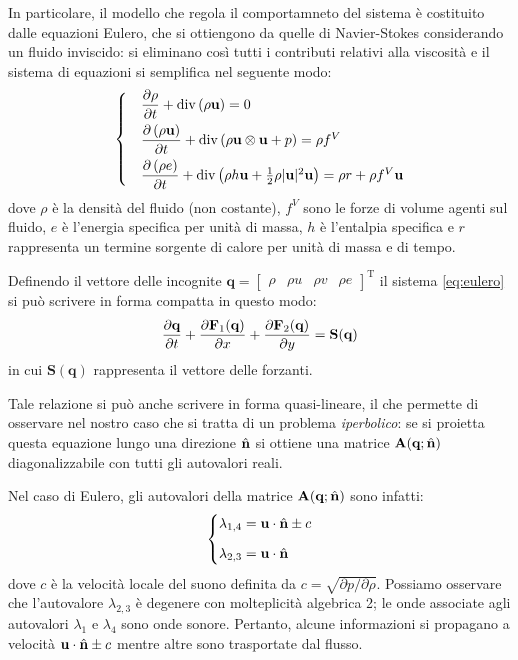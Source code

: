 In particolare, il modello che regola il comportamneto del sistema è costituito dalle equazioni Eulero, che si ottiengono da quelle di Navier-Stokes considerando un fluido inviscido: si eliminano così tutti i contributi relativi alla viscosità e il sistema di equazioni si semplifica nel seguente modo:
\begin{equation} \label{eq:eulero}
\begin{cases}
&\dfrac{\partial \rho}{\partial t} + \operatorname{div} \left(\rho \textbf{u}\right) = 0\\[1.5ex]
&\dfrac{\partial \left(\rho \textbf{u}\right)}{\partial t} + \operatorname{div} \left(\rho \textbf{u} \otimes \textbf{u} + p \right) = \rho f^{V}\\[1.5ex]
&\dfrac{\partial \left(\rho e\right)}{\partial t} + \operatorname{div} \left(\rho h \textbf{u} + \frac{1}{2} \rho |\textbf{u}|^{2} \textbf{u} \right) = \rho r + \rho f^{V} \textbf{u}
\end{cases}
\end{equation}
dove $\rho$ è la densità del fluido (non costante), $f^{V}$ sono le forze di volume agenti sul fluido, $e$ è l'energia specifica per unità di massa, $h$ è l'entalpia specifica e $r$ rappresenta un termine sorgente di calore per unità di massa e di tempo.  

Definendo il vettore delle incognite $\textbf{q} = \left[ \begin{matrix} \rho & \rho u & \rho v & \rho e \end{matrix} \right]^{\text{T}}$ il sistema \eqref{eq:eulero} si può scrivere in forma compatta in questo modo:
\begin{equation*}
\dfrac{\partial \textbf{q}}{\partial t} + \dfrac{\partial \textbf{F}_{1}(\textbf{q})}{\partial x} + \dfrac{\partial \textbf{F}_{2}(\textbf{q})}{\partial y} = \textbf{S}(\textbf{q})
\end{equation*}
in cui $\textbf{S}(\textbf{q})$ rappresenta il vettore delle forzanti.
 
Tale relazione si può anche scrivere in forma quasi-lineare, il che permette di osservare nel nostro caso che si tratta di un problema \emph{iperbolico}: se si proietta questa equazione lungo una direzione $\hat{\mathbf{n}}$ si ottiene una matrice $\textbf{A}(\textbf{q};\hat{\mathbf{n}})$ diagonalizzabile con tutti gli autovalori reali.
 
Nel caso di Eulero, gli autovalori della matrice $\textbf{A}(\textbf{q};\hat{\mathbf{n}})$ sono infatti:
\begin{equation*}
\left\{ \begin{aligned}
\lambda_{1,4} &= \textbf{u} \cdot \hat{\mathbf{n}} \pm c \\[1.5ex]
\lambda_{2,3} &= \textbf{u} \cdot \hat{\mathbf{n}}
\end{aligned}  \right.
\end{equation*}
dove $c$ è la velocità locale del suono definita da $c = \sqrt{\partial{p}/\partial{\rho}}$. Possiamo osservare che l'autovalore $\lambda_{2,3}$ è degenere con molteplicità algebrica 2; le onde associate agli autovalori $\lambda_{1}$ e $\lambda_{4}$ sono onde sonore. Pertanto, alcune informazioni si propagano a velocità $\mathbf{u}\cdot\hat{\mathbf{n}} \pm c$ mentre altre sono trasportate dal flusso.

